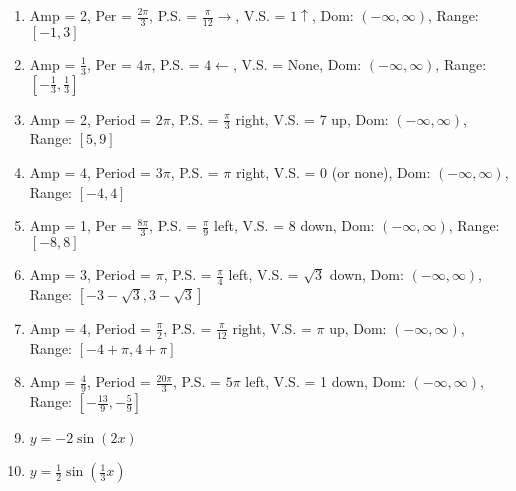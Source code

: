 \begin{enumerate}
	\item Amp = 2, Per = $\frac{2\pi}{3}$, P.S. = $\frac{\pi}{12} \rightarrow$, V.S. = $1 \uparrow$, Dom: $(-\infty, \infty)$, Range: $[-1, 3]$
    \item Amp = $\frac{1}{3}$, Per = $4\pi$, P.S. = $4 \leftarrow$, V.S. = None, Dom: $(-\infty, \infty)$, Range: $\left[-\frac{1}{3}, \frac{1}{3}\right]$
    \item Amp = 2, Period = $2\pi$, P.S. = $\frac{\pi}{3}$ right, V.S. = 7 up, Dom: $(-\infty, \infty)$, Range: $[5, 9]$
    \item Amp = 4, Period = $3\pi$, P.S. = $\pi$ right, V.S. = 0 (or none), Dom: $(-\infty, \infty)$, Range: $[-4,4]$
    \item Amp = 1, Per = $\frac{8\pi}{3}$, P.S. = $\frac{\pi}{9}$ left, V.S. = 8 down, Dom: $(-\infty, \infty)$, Range: $[-8,8]$
	\item Amp = 3, Period = $\pi$, P.S. = $\frac{\pi}{4}$ left, V.S. = $\sqrt{3}$ down, Dom: $(-\infty, \infty)$, Range: $[-3-\sqrt{3}, 3-\sqrt{3}]$
	\item Amp = 4, Period = $\frac{\pi}{2}$, P.S. = $\frac{\pi}{12}$ right, V.S. = $\pi$ up, Dom: $(-\infty, \infty)$, Range: $[-4+\pi, 4+\pi]$
	\item Amp = $\frac{4}{9}$, Period = $\frac{20\pi}{3}$, P.S. = $5\pi$ left, V.S. = 1 down, Dom: $(-\infty, \infty)$, Range: $\left[-\frac{13}{9}, -\frac{5}{9}\right]$
    
    \item $y = -2\sin(2x)$
	\item $y = \frac{1}{2}\sin\left(\frac{1}{3}x\right)$
\end{enumerate}